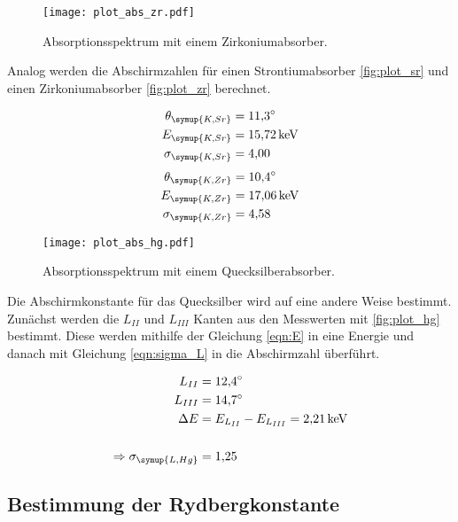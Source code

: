 \begin{figure}[H]
  \centering
  \texttt{[image: plot\_abs\_zr.pdf]}
  \caption{Absorptionsspektrum mit einem Zirkoniumabsorber.}
  \label{fig:plot_zr}
\end{figure}

Analog werden die Abschirmzahlen für einen Strontiumabsorber \eqref{fig:plot_sr} und einen
Zirkoniumabsorber \eqref{fig:plot_zr} berechnet.

\begin{align*}
  \theta_\symup{K,Sr} &= \SI{11.3}{\degree}\\
  E_\symup{K,Sr} &= \SI{15.72}{\kilo\eV}\\
  \sigma_\symup{K,Sr} &= \num{4.00}\\
\end{align*}
\begin{align*}
  \theta_\symup{K,Zr} &= \SI{10.4}{\degree}\\
  E_\symup{K,Zr} &= \SI{17.06}{\kilo\eV}\\
  \sigma_\symup{K,Zr} &=\num{4.58}\\
\end{align*}


\begin{figure}[H]
  \centering
  \texttt{[image: plot\_abs\_hg.pdf]}
  \caption{Absorptionsspektrum mit einem Quecksilberabsorber.}
  \label{fig:plot_hg}
\end{figure}

Die Abschirmkonstante für das Quecksilber wird auf eine andere Weise bestimmt. Zunächst
werden die $L_{II}$ und $L_{III}$ Kanten aus den Messwerten mit \eqref{fig:plot_hg} bestimmt.
Diese werden mithilfe der Gleichung \eqref{eqn:E} in eine Energie und danach
mit Gleichung \eqref{eqn:sigma_L} in die Abschirmzahl überführt.

\begin{align*}
  L_{II} &= \SI{12.4}{\degree}\\
  L_{III}&= \SI{14.7}{\degree}\\
  \Delta E &= E_{L_{II}}-E_{L_{III}} = \SI{2.21}{\kilo\eV}\\\\
  \Rightarrow \sigma_\symup{L,Hg} &= \num{1.25}\\
\end{align*}


\subsection{Bestimmung der Rydbergkonstante}


